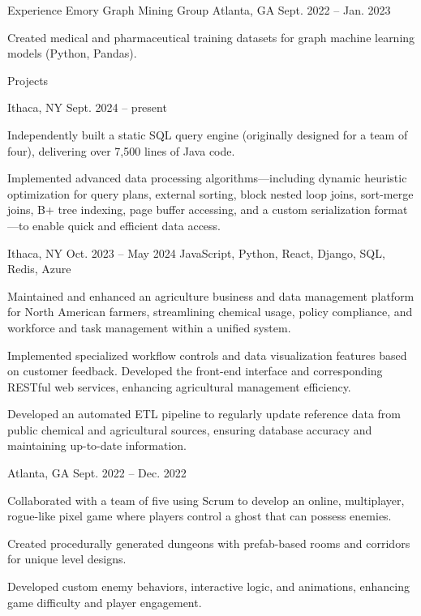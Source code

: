 \documentclass[10pt]{article}
\begin{document}
\begin{customsection}{Experience}
    {Emory Graph Mining Group} 
    {Atlanta, GA} 
    {Sept. 2022 -- Jan. 2023}
    {
        \item Created medical and pharmaceutical training datasets for graph machine learning models (Python, Pandas).
    }
    
\end{customsection}

\begin{customsection}{Projects}

    {Ithaca, NY}
    {Sept. 2024 -- present} 
    {} 
    { 
        \item Independently built a static SQL query engine (originally designed for a team of four), delivering over 7,500 lines of Java code.
        \item Implemented advanced data processing algorithms—including dynamic heuristic optimization for query plans, external sorting, block nested loop joins, sort-merge joins, B+ tree indexing, page buffer accessing, and a custom serialization format—to enable quick and efficient data access.
    }

    {Ithaca, NY}
    {Oct. 2023 -- May 2024}
    {JavaScript, Python, React, Django, SQL, Redis, Azure}
    {
        \item Maintained and enhanced an agriculture business and data management platform for North American farmers, streamlining chemical usage, policy compliance, and workforce and task management within a unified system.
        \item Implemented specialized workflow controls and data visualization features based on customer feedback. Developed the front-end interface and corresponding RESTful web services, enhancing agricultural management efficiency.
        \item Developed an automated ETL pipeline to regularly update reference data from public chemical and agricultural sources, ensuring database accuracy and maintaining up-to-date information.
    }

    {Atlanta, GA}
    {Sept. 2022 -- Dec. 2022}
    {}
    {
        \item Collaborated with a team of five using Scrum to develop an online, multiplayer, rogue-like pixel game where players control a ghost that can possess enemies.
        \item Created procedurally generated dungeons with prefab-based rooms and corridors for unique level designs.
        \item Developed custom enemy behaviors, interactive logic, and animations, enhancing game difficulty and player engagement.
    }

\end{customsection}
\end{document}
